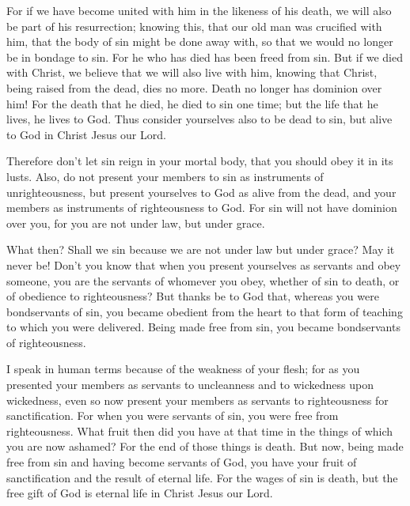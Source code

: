  For if we have become united with him in the likeness of
his death, we will also be part of his resurrection; 
knowing this, that our old man was crucified with him, that the body of
sin might be done away with, so that we would no longer be in bondage to
sin.  For he who has died has been freed from sin.
 But if we died with Christ, we believe that we will also
live with him,  knowing that Christ, being raised from the
dead, dies no more. Death no longer has dominion over him! 
For the death that he died, he died to sin one time; but the life that
he lives, he lives to God.  Thus consider yourselves also
to be dead to sin, but alive to God in Christ Jesus our Lord.

 Therefore don't let sin reign in your mortal body, that
you should obey it in its lusts.  Also, do not present your
members to sin as instruments of unrighteousness, but present yourselves
to God as alive from the dead, and your members as instruments of
righteousness to God.  For sin will not have dominion over
you, for you are not under law, but under grace.

 What then? Shall we sin because we are not under law but
under grace? May it never be!  Don't you know that when you
present yourselves as servants and obey someone, you are the servants of
whomever you obey, whether of sin to death, or of obedience to
righteousness?  But thanks be to God that, whereas you were
bondservants of sin, you became obedient from the heart to that form of
teaching to which you were delivered.  Being made free from
sin, you became bondservants of righteousness.

 I speak in human terms because of the weakness of your
flesh; for as you presented your members as servants to uncleanness and
to wickedness upon wickedness, even so now present your members as
servants to righteousness for sanctification.  For when you
were servants of sin, you were free from righteousness. 
What fruit then did you have at that time in the things of which you are
now ashamed? For the end of those things is death.  But
now, being made free from sin and having become servants of God, you
have your fruit of sanctification and the result of eternal life.
 For the wages of sin is death, but the free gift of God is
eternal life in Christ Jesus our Lord.

